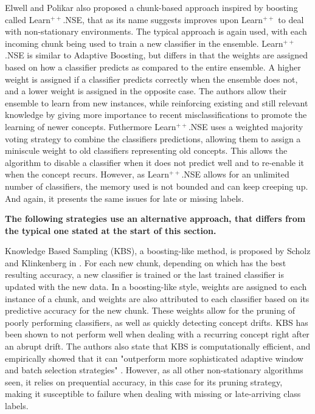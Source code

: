 Elwell and Polikar also proposed a chunk-based approach inspired by boosting called \cite{elwell2011incremental} Learn$^{++}$.NSE, that as its name suggests improves upon Learn$^{++}$ to deal with non-stationary environments. The typical approach is again used, with each incoming chunk being used to train a new classifier in the ensemble. Learn$^{++}$.NSE is similar to Adaptive Boosting, but differs in that the weights are assigned based on how a classifier predicts as compared to the entire ensemble. A higher weight is assigned if a classifier predicts correctly when the ensemble does not, and a lower weight is assigned in the opposite case. The authors allow their ensemble to learn from new instances, while reinforcing existing and still relevant knowledge by giving more importance to recent misclassifications to promote the learning of newer concepts. Futhermore Learn$^{++}$.NSE uses a weighted majority voting strategy to combine the classifiers predictions, allowing them to assign a miniscule weight to old classifiers representing old concepts. This allows the algorithm to disable a classifier when it does not predict well and to re-enable it when the concept recurs. However, as Learn$^{++}$.NSE allows for an unlimited number of classifiers, the memory used is not bounded and can keep creeping up. And again, it presents the same issues for late or missing labels.


\textbf{The following strategies use an alternative approach, that differs from the typical one stated at the start of this section.}

Knowledge Based Sampling (KBS), a boosting-like method, is proposed by Scholz and Klinkenberg in \cite{scholz2005ensemble}. For each new chunk, depending on which has the best resulting accuracy, a new classifier is trained or the last trained classifier is updated with the new data. In a boosting-like style, weights are assigned to each instance of a chunk, and weights are also attributed to each classifier based on its predictive accuracy for the new chunk. These weights allow for the pruning of poorly performing classifiers, as well as quickly detecting concept drifts. KBS has been shown to not perform well when dealing with a recurring concept right after an abrupt drift. The authors also state that KBS is computationally efficient, and empirically showed that it can "outperform more sophisticated adaptive window and batch selection strategies" \cite{scholz2005ensemble}. However, as all other non-stationary algorithms seen, it relies on prequential accuracy, in this case for its pruning strategy, making it susceptible to failure when dealing with missing or late-arriving class labels.

